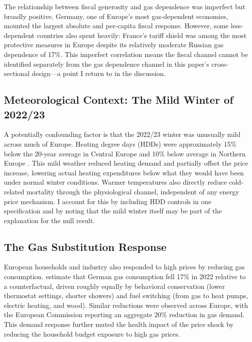 \documentclass[12pt]{article}
\begin{document}
The relationship between fiscal generosity and gas dependence was imperfect but broadly positive. Germany, one of Europe's most gas-dependent economies, mounted the largest absolute and per-capita fiscal response. However, some less-dependent countries also spent heavily: France's tariff shield was among the most protective measures in Europe despite its relatively moderate Russian gas dependence of 17\%. This imperfect correlation means the fiscal channel cannot be identified separately from the gas dependence channel in this paper's cross-sectional design---a point I return to in the discussion.

\subsection{Meteorological Context: The Mild Winter of 2022/23}

A potentially confounding factor is that the 2022/23 winter was unusually mild across much of Europe. Heating degree days (HDDs) were approximately 15\% below the 20-year average in Central Europe and 10\% below average in Northern Europe \citep{eurocomm2023}. This mild weather reduced heating demand and partially offset the price increase, lowering actual heating expenditures below what they would have been under normal winter conditions. Warmer temperatures also directly reduce cold-related mortality through the physiological channel, independent of any energy price mechanism. I account for this by including HDD controls in one specification and by noting that the mild winter itself may be part of the explanation for the null result.

\subsection{The Gas Substitution Response}

European households and industry also responded to high prices by reducing gas consumption. \citet{ruhnau2023} estimate that German gas consumption fell 17\% in 2022 relative to a counterfactual, driven roughly equally by behavioral conservation (lower thermostat settings, shorter showers) and fuel switching (from gas to heat pumps, electric heating, and wood). Similar reductions were observed across Europe, with the European Commission reporting an aggregate 20\% reduction in gas demand. This demand response further muted the health impact of the price shock by reducing the household budget exposure to high gas prices.
\end{document}
